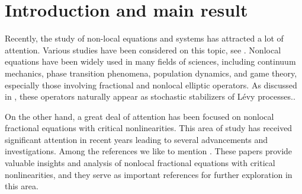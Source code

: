 \documentclass[reqno]{amsart}
\begin{document}
\maketitle
{}
\newtheorem{theorem}{Theorem}[section]
\newtheorem{lemma}[theorem]{Lemma}
\newtheorem{definition}[theorem]{Definition}
\newtheorem{proposition}[theorem]{Proposition}
\allowdisplaybreaks

\section{Introduction and main result}

Recently, the study of non-local equations and systems has attracted a lot of 
attention. Various studies have been considered on this topic, see 
\cite{t1, t2, t3, t4, D, t5, a, t7, s, qui, serv2, serv4, t9, t10}. 
Nonlocal equations have been widely used in many fields of sciences, 
including continuum mechanics, phase transition phenomena, population dynamics, 
and game theory, especially those involving fractional and nonlocal elliptic operators. 
As discussed in \cite{l1, caff}, these operators naturally appear as stochastic 
stabilizers of L\'evy processes..

On the other hand, a great deal of attention has been focused on nonlocal fractional 
equations with critical nonlinearities. This area of study has received significant 
attention in recent years leading to several advancements and investigations.
Among the references we like to mention \cite{Alv, ambr,t1,daoua,f2,o,Mok, o2,p,t9}. 
These papers provide valuable insights and analysis of nonlocal fractional equations 
with critical nonlinearities, and they serve as important references for further 
exploration in this area.
\end{document}
